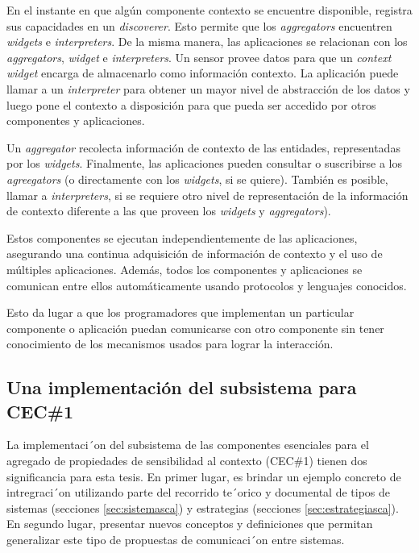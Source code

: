 {En el instante en que algún componente contexto se encuentre disponible,
registra sus capacidades en un \textit{discoverer}. Esto permite que los
\textit{aggregators} encuentren \textit{widgets} e \textit{interpreters}. De la misma manera, las aplicaciones se relacionan con los \textit{aggregators}, \textit{widget} e \textit{interpreters}. Un sensor provee datos para que un \textit{context widget} encarga de almacenarlo como información contexto. La aplicación puede llamar a un \textit{interpreter} para obtener un mayor nivel de abstracción de los datos y luego pone el contexto a disposición para que pueda ser accedido por otros componentes y aplicaciones.

Un \textit{aggregator} recolecta información de contexto de las entidades,
representadas por los \textit{widgets}. Finalmente, las aplicaciones pueden
consultar o suscribirse a los \textit{agreegators} (o directamente con los \textit{widgets}, si se quiere). También es posible, llamar a \textit{interpreters}, si se requiere otro nivel de representación de la información de contexto diferente a las que proveen los \textit{widgets} y \textit{aggregators}).

Estos componentes se ejecutan independientemente de las aplicaciones, asegurando una continua adquisición de información de contexto y el uso de múltiples aplicaciones. Además, todos los componentes y aplicaciones se comunican entre ellos automáticamente usando protocolos y lenguajes conocidos.

Esto da lugar a que los programadores que implementan un particular componente o aplicación puedan comunicarse con otro componente sin tener conocimiento de los mecanismos usados para lograr la interacción.


\subsection{Una implementación del subsistema para CEC\#1}

La implementaci´on del subsistema de las componentes esenciales para el
agregado de propiedades de sensibilidad al contexto (CEC\#1) tienen dos
significancia para esta tesis. En primer lugar, es brindar un ejemplo concreto
de intregraci´on utilizando parte del recorrido te´orico y documental
de tipos de sistemas (secciones \ref{sec:sistemasca})  y estrategias (secciones
\ref{sec:estrategiasca}). En segundo lugar, presentar nuevos conceptos y
definiciones que permitan generalizar este tipo de propuestas de comunicaci´on
entre sistemas. 

}
